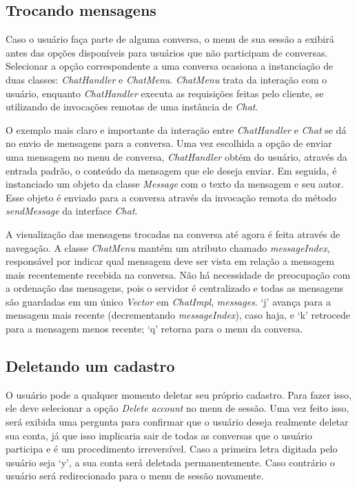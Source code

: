 \documentclass[../main.tex]{subfiles}
\begin{document}
\subsection{Trocando mensagens}

Caso o usuário faça parte de alguma conversa, o menu de sua sessão a exibirá antes das opções disponíveis para usuários que não participam de conversas.
Selecionar a opção correspondente a uma conversa ocasiona a instanciação de duas classes: \textit{ChatHandler} e \textit{ChatMenu}.
\textit{ChatMenu} trata da interação com o usuário, enquanto \textit{ChatHandler} executa as requisições feitas pelo cliente, se utilizando de invocações remotas de uma instância de \textit{Chat}.

O exemplo mais claro e importante da interação entre \textit{ChatHandler} e \textit{Chat} se dá no envio de mensagens para a conversa.
Uma vez escolhida a opção de enviar uma mensagem no menu de conversa, \textit{ChatHandler} obtém do usuário, através da entrada padrão, o conteúdo da mensagem que ele deseja enviar.
Em seguida, é instanciado um objeto da classe \textit{Message} com o texto da mensagem e seu autor.
Esse objeto é enviado para a conversa através da invocação remota do método \textit{sendMessage} da interface \textit{Chat}.

A visualização das mensagens trocadas na conversa até agora é feita através de navegação.
A classe \textit{ChatMenu} mantém um atributo chamado \textit{messageIndex}, responsável por indicar qual mensagem deve ser vista em relação a mensagem mais recentemente recebida na conversa.
Não há necessidade de preocupação com a ordenação das mensagens, pois o servidor é centralizado e todas as mensagens são guardadas em um único \textit{Vector} em \textit{ChatImpl}, \textit{messages}.
`j' avança para a mensagem mais recente (decrementando \textit{messageIndex}), caso haja, e `k' retrocede para a mensagem menos recente; `q' retorna para o menu da conversa.

\subsection{Deletando um cadastro}

O usuário pode a qualquer momento deletar seu próprio cadastro.
Para fazer isso, ele deve selecionar a opção \textit{Delete account} no menu de sessão.
Uma vez feito isso, será exibida uma pergunta para confirmar que o usuário deseja realmente deletar sua conta, já que isso implicaria sair de todas as conversas que o usuário participa e é um procedimento irreversível.
Caso a primeira letra digitada pelo usuário seja `y', a sua conta será deletada permanentemente.
Caso contrário o usuário será redirecionado para o menu de sessão novamente.
\end{document}
